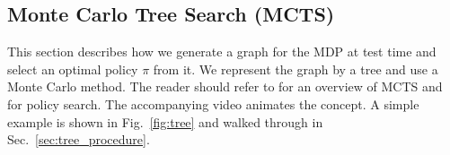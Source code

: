 \documentclass[letterpaper, 10 pt, conference]{ieeeconf}  %
\newcommand{\TODO}[1]{{\color{red}TODO: #1}}
\begin{document}



\subsection{Monte Carlo Tree Search (MCTS)}
\label{sec:mcts}


This section describes how we %
generate a graph for the MDP at test time and select an optimal policy $\pi$ from it.
We represent the graph by a tree and use a Monte Carlo %
method.
The reader should refer to \cite{browne2012} for an overview of MCTS and \cite{kaelblingRL} for policy search.
The accompanying video animates the concept.
A simple example is shown in Fig.~\ref{fig:tree} and walked through in Sec.~\ref{sec:tree_procedure}.



\end{document}
